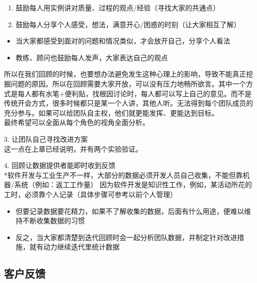 \begin{enumerate}
\tightlist
\item
  鼓励每人用实例讲对质量、过程的观点/经验（寻找大家的共通点）
\item
  鼓励每人分享个人感受，想法，满意开心/困惑的时刻（让大家相互了解）
\end{enumerate}

\begin{itemize}
\tightlist
\item
  当大家都感受到面对的问题和情况类似，才会放开自己，分享个人看法
\item
  教练、顾问也鼓励每人发声，大家表达自己的观点
\end{itemize}

所以在我们回顾的时候，也要想办法避免发生这种心理上的影响，导致不能真正挖掘问题的原因。所以在回顾需要大家开放，可以没有压力地畅所欲言。其中一个方式是每人都有水笔+便利贴，找根因讨论时，每人都可以写上自己的意见。而不是传统开会方式，很多时候都只是某一个人讲，其他人听。无法得到每个团队成员的充分参与。如果可以给团队自主权，他们就更能发挥、更能达到目标。\\
最终希望可以全面从每个角色的视角全面分析。

3. 让团队自己寻找改进方案\\

这一点在上章已经说明，并有两个实验验证。

4. 回顾让数据提供者能即时收到反馈\\
*软件开发与工业生产不一样，大部分的数据必须开发人员自己收集，不能但靠机器/系统（例如：返工工作量）
因为软件开发是知识性工作，例如，某活动所花的工时，必须靠个人记录（具体步骤可参考以前个人管理）

\begin{itemize}
\tightlist
\item
  但要记录数据要花精力，如果不了解收集的数据，后面有什么用途，便难以维持不断收集数据的习惯
\item
  反之，当大家都清楚到迭代回顾时会一起分析团队数据，并制定针对改进措施，就有动力继续迭代里统计数据
\end{itemize}

\hypertarget{ux5ba2ux6237ux53cdux9988}{%
\subsection{客户反馈}\label{ux5ba2ux6237ux53cdux9988}}

